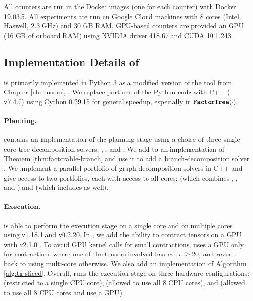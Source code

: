 All counters are run in the Docker images (one for each counter) with Docker 19.03.5. All experiments are run on Google Cloud  machines with 8 cores (Intel Haswell, 2.3 GHz) and 30 GB RAM. GPU-based counters are provided an  GPU (16 GB of onboard RAM) using NVIDIA driver 418.67 and CUDA 10.1.243.

\subsection{Implementation Details of }
\label{sec:experiments:impl}
 is primarily implemented in Python 3 as a modified version of the tool from Chapter \ref{ch:tensors}, . We replace portions of the Python code with C++ ( v7.4.0) using Cython 0.29.15 for general speedup, especially in $\texttt{\upshape FactorTree}(\cdot)$.

\paragraph{Planning.} 
 contains an implementation of the planning stage using a choice of three single-core tree-decomposition solvers:  \cite{Tamaki17},  \cite{HS18}, and  \cite{AMW17}. We add to  an implementation of Theorem \ref{thm:factorable-branch} and use it to add a branch-decomposition solver  \cite{hicks02}.
We implement a parallel portfolio of graph-decomposition solvers in C++ and give  access to two portfolios, each with access to all cores:  (which combines ,  , and ) and  (which includes  as well).

\paragraph{Execution.} 
 is able to perform the execution stage on a single core and on multiple cores using  v1.18.1 and  v0.2.20. In , we add the ability to contract tensors on a GPU with  v2.1.0 \cite{ABCCDDDGII16}. To avoid GPU kernel calls for small contractions,  uses a GPU only for contractions where one of the tensors involved has rank $\geq 20$, and reverts back to using multi-core  otherwise. We also add an implementation of Algorithm \ref{alg:tn-sliced}.
Overall,  runs the execution stage on three hardware configurations:  (restricted to a single CPU core),  (allowed to use all 8 CPU cores), and  (allowed to use all 8 CPU cores and use a GPU).

